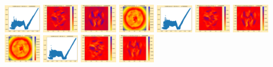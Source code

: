 \documentclass[11pt]{article}
\begin{document}
\includegraphics[width=0.11875\textwidth]{frame0046fig1.png}
\includegraphics[width=0.11875\textwidth]{frame0046fig2.png}
\includegraphics[width=0.11875\textwidth]{frame0046fig3.png}
\includegraphics[width=0.11875\textwidth]{frame0047fig0.png}
\includegraphics[width=0.11875\textwidth]{frame0047fig1.png}
\includegraphics[width=0.11875\textwidth]{frame0047fig2.png}
\includegraphics[width=0.11875\textwidth]{frame0047fig3.png}
\vskip 10pt 
\includegraphics[width=0.11875\textwidth]{frame0048fig0.png}
\includegraphics[width=0.11875\textwidth]{frame0048fig1.png}
\includegraphics[width=0.11875\textwidth]{frame0048fig2.png}
\includegraphics[width=0.11875\textwidth]{frame0048fig3.png}
\end{document}
